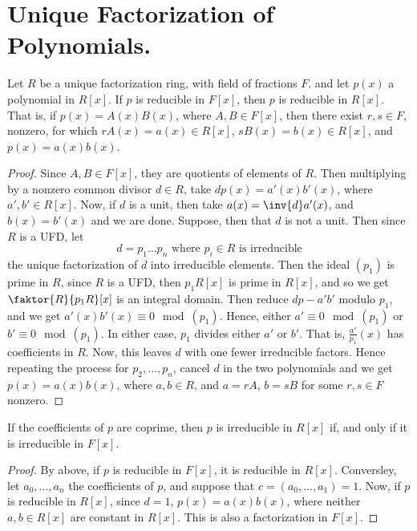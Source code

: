 \section{Unique Factorization of Polynomials.}

\begin{lemma}[Gauss]\label{3.2.1}
    Let $R$ be a unique factorization ring, with field of fractions $F$. and let
    $p(x)$ a polynomial in $R[x]$. If $p$ is reducible in $F[x]$, then $p$ is
    reducible in  $R[x]$. That is, if $p(x)=A(x)B(x)$, where $A,B \in F[x]$,
    then there exist $r,s \in F$, nonzero, for which  $rA(x)=a(x) \in R[x]$,
    $sB(x)=b(x) \in R[x]$, and $p(x)=a(x)b(x)$.
\end{lemma}
\begin{proof}
    Since $A,B \in F[x]$, they are quotients of elements of $R$. Then
    multiplying by a nonzero common divisor  $d \in R$, take  $dp(x)=a'(x)b'(x)$,
    where $a',b' \in R[x]$. Now, if $d$ is a unit, then take
    $a(x)=\inv{d}a'(x)$, and $b(x)=b'(x)$ and we are done. Suppose, then that
    $d$ is not a unit. Then since  $R$ is a UFD, let
    \begin{equation*}
        d=p_1 \dots p_n \text{ where } p_i \in R \text{ is irreducible}
    \end{equation*}
    the unique factorization of $d$ into irreducible elements. Then the ideal
    $(p_1)$ is prime in $R$, since  $R$ is a UFD, then  $p_1R[x]$ is prime in
    $R[x]$, and so we get $\faktor{R}{p_1R}[x]$ is an integral domain. Then
    reduce $dp-a'b'$ modulo  $p_1$, and we get $a'(x)b'(x) \equiv 0
    \mod{(p_1)}$. Hence, either $a' \equiv 0 \mod{(p_1)}$ or $b' \equiv 0
    \mod{(p_1)}$. In either case, $p_1$ divides either $a'$ or  $b'$. That is,
    $\frac{a'}{p_1}(x)$ has coefficients in $R$. Now, this leaves  $d$ with one
    fewer irreducible factors. Hence repeating the process for  $p_2, \dots,
    p_n$, cancel $d$ in the two polynomials and we get  $p(x)=a(x)b(x)$, where
    $a,b \in R$, and  $a=rA$,  $b=sB$ for some  $r,s \in F$ nonzero.
\end{proof}
\begin{corollary}
    If the coefficients of $p$ are coprime, then  $p$ is irreducible in  $R[x]$
    if, and only if it is irreducible in $F[x]$.
\end{corollary}
\begin{proof}
    By above, if $p$ is reducible in  $F[x]$, it is reducible in $R[x]$.
    Conversley, let $a_0, \dots, a_n$ the coefficients of $p$, and suppose that
     $c=(a_0, \dots, a_1)=1$. Now, if $p$ is reducible in $R[x]$, since $d=1$,
     $p(x)=a(x)b(x)$, where neither $a,b \in R[x]$ are constant in $R[x]$. This
     is also a factorization in $F[x]$.
\end{proof}

